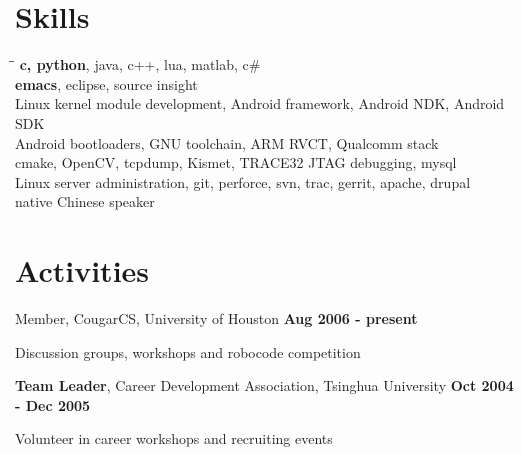 \documentclass[overlapped, line]{resume}
\begin{document}
\begin{resume}

         \vspace{-15pt}\section{Skills} 
         \begin{tabbing}
           \= \hspace{1.5in}\= \kill
            \>\textbf{c, python}, java, c++, lua, matlab, c\#\\
            \>\textbf{emacs}, eclipse, source insight\\
            \>Linux kernel module development, Android framework, Android NDK, Android SDK\\
           \> \>Android bootloaders, GNU toolchain, ARM RVCT, Qualcomm stack\\ 
           \> \>cmake, OpenCV, tcpdump, Kismet, TRACE32 JTAG debugging, mysql\\
            \> Linux server administration, git, perforce, svn, trac, gerrit, apache, drupal\\
            \>native Chinese speaker

         \end{tabbing}

         \vspace{-15pt}\section{Activities}
         Member, CougarCS, University of Houston  \hfill {\bf Aug 2006 - present}\\
         \vspace{-10pt}      %
         \begin{list2}
         \item Discussion groups, workshops and robocode competition
         \end{list2}  \vspace{-5pt}

         {\bf Team Leader}, Career Development Association, Tsinghua University \hfill {\bf Oct 2004 -  Dec 2005}\\
         \vspace{-10pt}      %
         \begin{list2}
         \item Volunteer in career workshops and recruiting events
         \end{list2}  \vspace{-5pt}


\end{resume}
\end{document}
